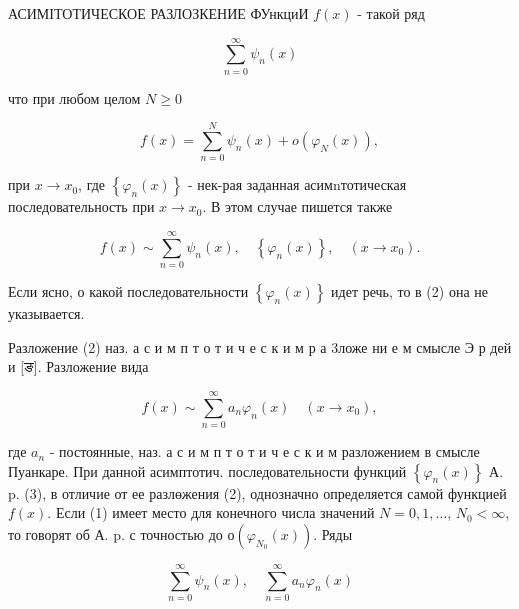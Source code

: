 \documentclass[10pt]{article}
\begin{document}
АСИМІТОТИЧЕСКОЕ РАЗЛОЗКЕНИЕ ФУнкциИ $f(x)$ - такой ряд



\[

\sum_{n=0}^{\infty} \psi_{n}(x)

\]



что при любом целом $N \geqslant 0$



\[

f(x)=\sum_{n=0}^{N} \psi_{n}(x)+o\left(\varphi_{N}(x)\right),

\]



при $x \rightarrow x_{0}$, где $\left\{\varphi_{n}(x)\right\}$ - нек-рая заданная асимnтотическая последовательность при $x \rightarrow x_{0}$. В этом случае пишется также



\[

f(x) \sim \sum_{n=0}^{\infty} \psi_{n}(x), \quad\left\{\varphi_{n}(x)\right\}, \quad\left(x \longrightarrow x_{0}\right) .

\]



Если ясно, о какой последовательности $\left\{\varphi_{n}(x)\right\}$ идет речь, то в (2) она не указывается.



Разложение (2) наз. а с и м п т о т и ч е с к и м р а 3ложе ни е м смысле Э р дей и [ङ]. Разложение вида



\[

f(x) \sim \sum_{n=0}^{\infty} a_{n} \varphi_{n}(x) \quad\left(x \longrightarrow x_{0}\right),

\]



где $a_{n}$ - постоянные, наз. а с и м п т о т и ч е с к и м разложением в смысле Пуанкаре. При данной асимптотич. последовательности функций $\left\{\varphi_{n}(x)\right\}$ А. p. (3), в отличие от ее разлөжения (2), однозначно определяется самой функцией $f(x)$. Если (1) имеет место для конечного числа значений $N=0,1, \ldots$, $N_{0}<\infty$, то говорят об А. p. с точностью до $о\left(\varphi_{N_{0}}(x)\right)$. Ряды



\[

\sum_{n=0}^{\infty} \psi_{n}(x), \quad \sum_{n=0}^{\infty} a_{n} \varphi_{n}(x)

\]
\end{document}

